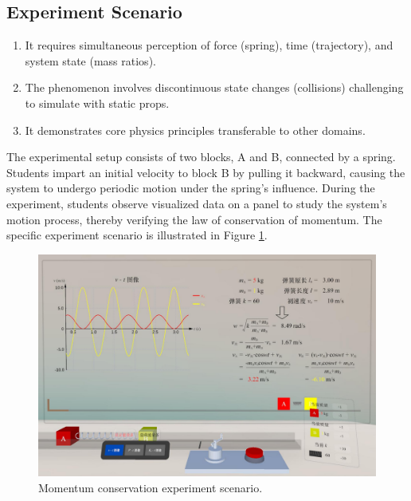 \documentclass[runningheads]{llncs}
\begin{document}
\subsection{Experiment Scenario}
\begin{enumerate}
    \item It requires simultaneous perception of force (spring), time (trajectory), and system state (mass ratios).
    \item The phenomenon involves discontinuous state changes (collisions) challenging to simulate with static props.
    \item It demonstrates core physics principles transferable to other domains.
\end{enumerate}

The experimental setup consists of two blocks, A and B, connected by a spring. Students impart an initial velocity to block B by pulling it backward, causing the system to undergo periodic motion under the spring's influence. During the experiment, students observe visualized data on a panel to study the system's motion process, thereby verifying the law of conservation of momentum. The specific experiment scenario is illustrated in Figure \ref{fig:experiment-scenario}.

\begin{figure}
  \centering
  \includegraphics[width=\linewidth]{image/experiment-scenario.pdf}
  \caption{Momentum conservation experiment scenario.}
  \label{fig:experiment-scenario}
\end{figure}
\end{document}
